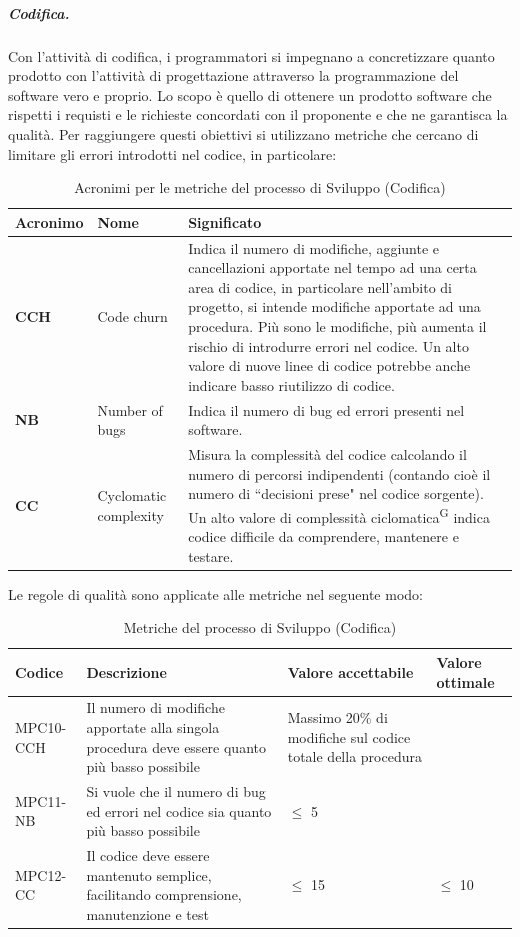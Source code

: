 \subparagraph{Codifica.}
Con l'attività di codifica, i programmatori si impegnano a concretizzare quanto prodotto con l'attività di progettazione attraverso la programmazione del software vero e proprio.
Lo scopo è quello di ottenere un prodotto software che rispetti i requisti e le richieste concordati con il proponente e che ne garantisca la qualità. Per raggiungere questi obiettivi si utilizzano metriche che cercano di limitare gli errori introdotti nel codice, in particolare:
\begin{table}[h!]
\centering
\def\arraystretch{1.5}
\begin{tabular}{ |m{2cm}|m{2.5cm}|m{9.5cm}| }
\hline
\rowcolor{lightgray!30}
\textbf{Acronimo} & \textbf{Nome} & \textbf{Significato}\\
\hline
\textbf{CCH} & Code churn & Indica il numero di modifiche, aggiunte e cancellazioni apportate nel tempo ad una certa area di codice, in particolare nell'ambito di progetto, si intende modifiche apportate ad una procedura. Più sono le modifiche, più aumenta il rischio di introdurre errori nel codice. Un alto valore di nuove linee di codice potrebbe anche indicare basso riutilizzo di codice.\\
\hline
\textbf{NB} & Number of bugs & Indica il numero di bug ed errori presenti nel software.\\
\hline
\textbf{CC} & Cyclomatic complexity & Misura la complessità del codice calcolando il numero di percorsi indipendenti (contando cioè il numero di ``decisioni prese" nel codice sorgente). Un alto valore di complessità ciclomatica\textsuperscript{G} indica codice difficile da comprendere, mantenere e testare.\\
\hline
\end{tabular}
\caption{Acronimi per le metriche del processo di Sviluppo (Codifica)}
\end{table}
\par Le regole di qualità sono applicate alle metriche nel seguente modo:
\begin{table}[h!]
\centering
\def\arraystretch{1.5}
\begin{tabular}{ |>{\centering\arraybackslash}m{2.5cm}|>{\centering\arraybackslash}m{5.5cm}|>{\centering\arraybackslash}m{3cm}|>{\centering\arraybackslash}m{3cm}| }
\hline
\rowcolor{black}
\textbf{\color{white} Codice} & \textbf{\color{white} Descrizione} & \textbf{\color{white} Valore accettabile} & \textbf{\color{white} Valore ottimale}\\
\hline
MPC10-CCH & Il numero di modifiche apportate alla singola procedura deve essere quanto più basso possibile & Massimo 20\% di modifiche sul codice totale della procedura & 0 \\
\hline
MPC11-NB & Si vuole che il numero di bug ed errori nel codice sia quanto più basso possibile & $\leq$ 5 & 0 \\
\hline
MPC12-CC & Il codice deve essere mantenuto semplice, facilitando comprensione, manutenzione e test & $\leq$ 15 & $\leq$ 10 \\
\hline
\end{tabular}
\caption{Metriche del processo di Sviluppo (Codifica)}
\end{table}

